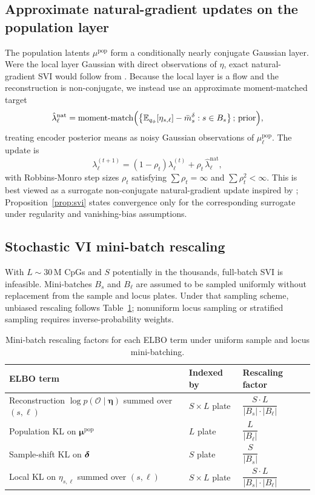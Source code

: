 \subsection{Approximate natural-gradient updates on the population layer}
The population latents $\mu^{\mathrm{pop}}$ form a conditionally nearly conjugate Gaussian layer. Were the local layer Gaussian with direct observations of $\eta$, exact natural-gradient SVI would follow from \citet{hoffman2013svi}. Because the local layer is a flow and the reconstruction is non-conjugate, we instead use an approximate moment-matched target
\begin{equation}
\hat{\lambda}_\ell^{\mathrm{nat}} = \text{moment-match}\Big(\big\{\mathbb{E}_{q_\phi}[\eta_{s,\ell}]-\bar m_s^\delta : s\in B_s\big\}\,;\,\text{prior}\Big),
\label{eq:nat-target}
\end{equation}
treating encoder posterior means as noisy Gaussian observations of $\mu^{\mathrm{pop}}_\ell$. The update is
\begin{equation}
\lambda_\ell^{(t+1)} = (1-\rho_t)\lambda_\ell^{(t)} + \rho_t\,\hat{\lambda}_\ell^{\mathrm{nat}},
\label{eq:nat-update}
\end{equation}
with Robbins-Monro step sizes $\rho_t$ satisfying $\sum\rho_t=\infty$ and $\sum\rho_t^2<\infty$. This is best viewed as a surrogate non-conjugate natural-gradient update inspired by \citet{khan2017cvi,lin2019natgrad}; Proposition~\ref{prop:svi} states convergence only for the corresponding surrogate under regularity and vanishing-bias assumptions.

\subsection{Stochastic VI mini-batch rescaling}
With $L\sim 30\,\text{M}$ CpGs and $S$ potentially in the thousands, full-batch SVI is infeasible. Mini-batches $B_s$ and $B_\ell$ are assumed to be sampled uniformly without replacement from the sample and locus plates. Under that sampling scheme, unbiased rescaling follows Table~\ref{tab:rescale}; nonuniform locus sampling or stratified sampling requires inverse-probability weights.

\begin{table}[htbp]
\centering\small
\caption{Mini-batch rescaling factors for each ELBO term under uniform sample and locus mini-batching.}
\label{tab:rescale}
\begin{tabular}{lll}
\toprule
ELBO term & Indexed by & Rescaling factor \\
\midrule
Reconstruction $\log p(\mathcal{O}\mid\bm\eta)$ summed over $(s,\ell)$ & $S\times L$ plate & $\dfrac{S\cdot L}{|B_s|\cdot|B_\ell|}$ \\[6pt]
Population KL on $\bm{\mu}^{\mathrm{pop}}$ & $L$ plate & $\dfrac{L}{|B_\ell|}$ \\[6pt]
Sample-shift KL on $\boldsymbol{\delta}$ & $S$ plate & $\dfrac{S}{|B_s|}$ \\[6pt]
Local KL on $\eta_{s,\ell}$ summed over $(s,\ell)$ & $S\times L$ plate & $\dfrac{S\cdot L}{|B_s|\cdot|B_\ell|}$ \\
\bottomrule
\end{tabular}
\end{table}

